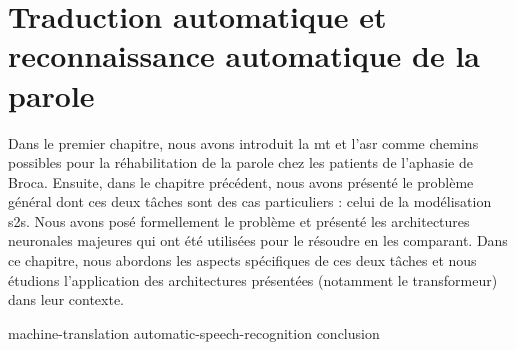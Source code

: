 \chapter{Traduction automatique et reconnaissance automatique de la parole}
\label{chap.mt-and-asr}

Dans le premier chapitre, nous avons introduit la \gls{mt} et l'\gls{asr} 
comme chemins possibles pour la réhabilitation de la parole chez les patients de l'aphasie de Broca.
Ensuite, dans le chapitre précédent, nous avons présenté le problème général
dont ces deux tâches sont des cas particuliers : celui de la modélisation \gls{s2s}.
Nous avons posé formellement le problème 
et présenté les architectures neuronales majeures qui ont été utilisées pour le résoudre en les comparant.
Dans ce chapitre, nous abordons les aspects spécifiques de ces deux tâches
et nous étudions l'application des architectures présentées (notamment le transformeur) dans leur contexte.

{machine-translation}
{automatic-speech-recognition}
{conclusion}